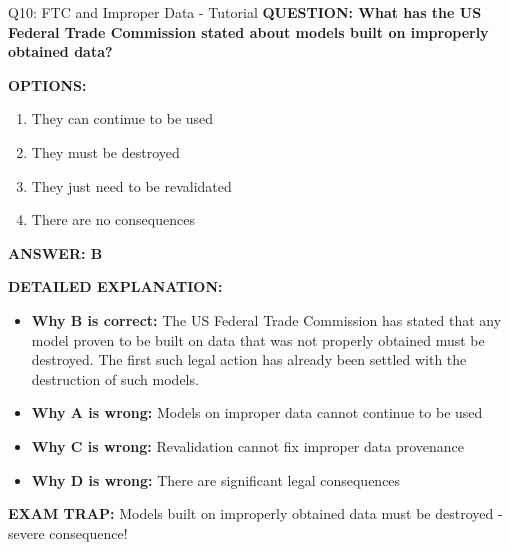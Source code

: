 \documentclass[8pt]{beamer}
\begin{document}
	\begin{frame}{Q10: FTC and Improper Data - Tutorial}
		\fontsize{6.5}{7.5}\selectfont
		\textbf{QUESTION: What has the US Federal Trade Commission stated about models built on improperly obtained data?}
		
		\vspace{0.1cm}
		\textbf{OPTIONS:}
		\begin{enumerate}
			\item They can continue to be used
			\item They must be destroyed
			\item They just need to be revalidated
			\item There are no consequences
		\end{enumerate}
		
		\vspace{0.1cm}
		\textcolor{myblue}{\textbf{ANSWER: B}}
		
		\vspace{0.1cm}
		\textbf{DETAILED EXPLANATION:}
		\begin{itemize}
			\item \textbf{Why B is correct:} The US Federal Trade Commission has stated that any model proven to be built on data that was not properly obtained must be destroyed. The first such legal action has already been settled with the destruction of such models.
			\item \textbf{Why A is wrong:} Models on improper data cannot continue to be used
			\item \textbf{Why C is wrong:} Revalidation cannot fix improper data provenance
			\item \textbf{Why D is wrong:} There are significant legal consequences
		\end{itemize}
		
		\textcolor{myred}{\textbf{EXAM TRAP:}} Models built on \textcolor{myblue}{improperly obtained data must be destroyed} - severe consequence!
	\end{frame}
	
\end{document}
